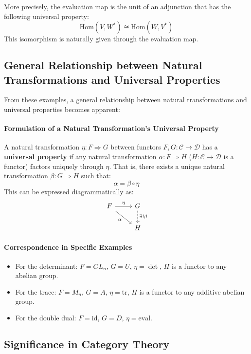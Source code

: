 \documentclass[uplatex,a4j,12pt,dvipdfmx]{jsarticle}
\begin{document}
More precisely, the evaluation map is the unit of an adjunction that has the following universal property:
\[
	\mathrm{Hom}(V, W^*) \cong \mathrm{Hom}(W, V^*)
\]
This isomorphism is naturally given through the evaluation map.

\subsection{General Relationship between Natural Transformations and Universal Properties}

From these examples, a general relationship between natural transformations and universal properties becomes apparent:

\paragraph{Formulation of a Natural Transformation's Universal Property}
A natural transformation $\eta: F \Rightarrow G$ between functors $F, G: \mathcal{C} \to \mathcal{D}$ has a \textbf{universal property} if any natural transformation $\alpha: F \Rightarrow H$ ($H: \mathcal{C} \to \mathcal{D}$ is a functor) factors uniquely through $\eta$. That is, there exists a unique natural transformation $\beta: G \Rightarrow H$ such that:
\[
	\alpha = \beta \circ \eta
\]
This can be expressed diagrammatically as:
\[
	\begin{tikzcd}
		F \arrow[r, "\eta"] \arrow[rd, "\alpha"'] & G \arrow[d, dashed, "\exists! \beta"] \\
		& H
	\end{tikzcd}
\]

\paragraph{Correspondence in Specific Examples}
\begin{itemize}
	\item For the determinant: $F = GL_n$, $G = U$, $\eta = \det$, $H$ is a functor to any abelian group.
	\item For the trace: $F = M_n$, $G = A$, $\eta = \text{tr}$, $H$ is a functor to any additive abelian group.
	\item For the double dual: $F = \mathrm{id}$, $G = D$, $\eta = \mathrm{eval}$.
\end{itemize}

\subsection{Significance in Category Theory}
\end{document}
